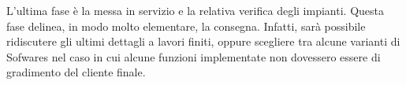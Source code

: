 L’ultima fase è la messa in servizio e la relativa verifica degli impianti. Questa fase delinea, in modo molto elementare, la consegna. Infatti, sarà possibile ridiscutere gli ultimi dettagli a lavori finiti, oppure scegliere tra alcune varianti di Sofwares nel caso in cui alcune funzioni implementate non dovessero essere di gradimento del cliente finale.
